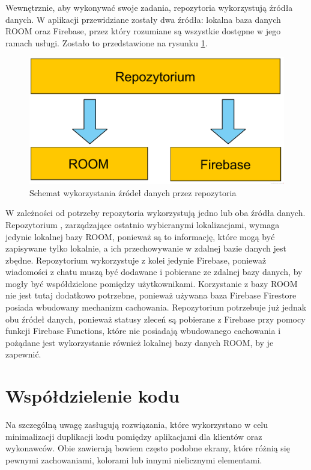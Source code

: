 Wewnętrznie, aby wykonywać swoje zadania, repozytoria wykorzystują źródła danych. W aplikacji przewidziane zostały dwa źródła: lokalna baza danych ROOM oraz Firebase, przez który rozumiane są wszystkie dostępne w jego ramach usługi. Zostało to przedstawione na rysunku \ref{fig:data-sources}.

\begin{figure}[ht]
  \centering
  \includegraphics[width=0.7\linewidth]{images/data_sources.png}
  \caption{Schemat wykorzystania źródeł danych przez repozytoria}
  \label{fig:data-sources}
\end{figure}

W zależności od potrzeby repozytoria wykorzystują jedno lub oba źródła danych. Repozytorium , zarządzające ostatnio wybieranymi lokalizacjami, wymaga jedynie lokalnej bazy ROOM, ponieważ są to informację, które mogą być zapisywane tylko lokalnie, a ich przechowywanie w zdalnej bazie danych jest zbędne. Repozytorium  wykorzystuje z kolei jedynie Firebase, ponieważ wiadomości z chatu muszą być dodawane i pobierane ze zdalnej bazy danych, by mogły być współdzielone pomiędzy użytkownikami. Korzystanie z bazy ROOM nie jest tutaj dodatkowo potrzebne, ponieważ używana baza Firebase Firestore posiada wbudowany mechanizm cachowania. Repozytorium  potrzebuje już jednak obu źródeł danych, ponieważ statusy zleceń są pobierane z Firebase przy pomocy funkcji Firebase Functions, które nie posiadają wbudowanego cachowania i pożądane jest wykorzystanie również lokalnej bazy danych ROOM, by je zapewnić.

\section{Współdzielenie kodu}
\label{code-sharing}

Na szczególną uwagę zasługują rozwiązania, które wykorzystano w celu minimalizacji duplikacji kodu pomiędzy aplikacjami dla klientów oraz wykonawców. Obie zawierają bowiem często podobne ekrany, które różnią się pewnymi zachowaniami, kolorami lub innymi nielicznymi elementami. 

